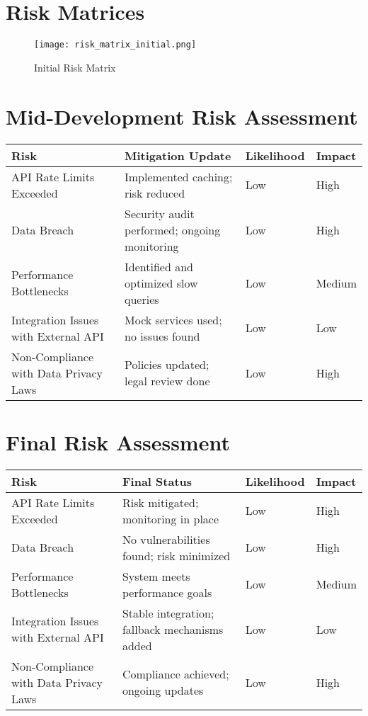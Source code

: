 \documentclass[12pt,a4paper]{report}
\begin{document}
\section{Risk Matrices}

\begin{figure}[H]
\centering
\texttt{[image: risk\_matrix\_initial.png]}
\caption{Initial Risk Matrix}
\end{figure}

\section{Mid-Development Risk Assessment}

\begin{longtable}{p{4cm} p{5cm} p{2cm} p{2cm}}
\toprule
\textbf{Risk} & \textbf{Mitigation Update} & \textbf{Likelihood} & \textbf{Impact} \\
\midrule
API Rate Limits Exceeded & Implemented caching; risk reduced & Low & High \\
Data Breach & Security audit performed; ongoing monitoring & Low & High \\
Performance Bottlenecks & Identified and optimized slow queries & Low & Medium \\
Integration Issues with External API & Mock services used; no issues found & Low & Low \\
Non-Compliance with Data Privacy Laws & Policies updated; legal review done & Low & High \\
\bottomrule
\end{longtable}

\section{Final Risk Assessment}

\begin{longtable}{p{4cm} p{5cm} p{2cm} p{2cm}}
\toprule
\textbf{Risk} & \textbf{Final Status} & \textbf{Likelihood} & \textbf{Impact} \\
\midrule
API Rate Limits Exceeded & Risk mitigated; monitoring in place & Low & High \\
Data Breach & No vulnerabilities found; risk minimized & Low & High \\
Performance Bottlenecks & System meets performance goals & Low & Medium \\
Integration Issues with External API & Stable integration; fallback mechanisms added & Low & Low \\
Non-Compliance with Data Privacy Laws & Compliance achieved; ongoing updates & Low & High \\
\bottomrule
\end{longtable}
\end{document}
